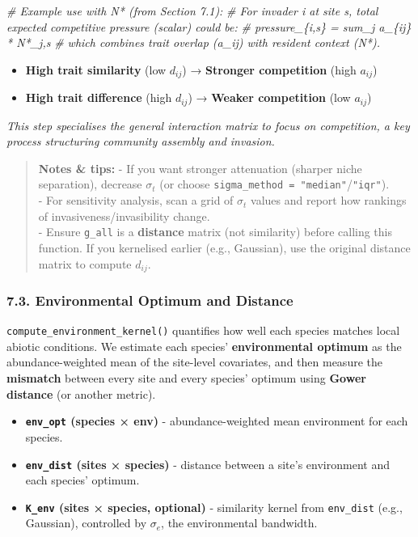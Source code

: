 \documentclass[
]{article}
\newenvironment{Shaded}{\begin{snugshade}}{\end{snugshade}}
\newcommand{\CommentTok}[1]{\textcolor[rgb]{0.56,0.35,0.01}{\textit{#1}}}
\providecommand{\tightlist}{%
  \setlength{\itemsep}{0pt}\setlength{\parskip}{0pt}}
\begin{document}
\begin{Shaded}
\begin{Highlighting}[]
\CommentTok{\# Example use with N* (from Section 7.1):}
\CommentTok{\# For invader i at site s, total expected competitive pressure (scalar) could be:}
\CommentTok{\#   pressure\_\{i,s\} = sum\_j a\_\{ij\} * N*\_j,s}
\CommentTok{\# which combines trait overlap (a\_ij) with resident context (N*).}
\end{Highlighting}
\end{Shaded}

\begin{itemize}
\tightlist
\item
  \textbf{High trait similarity} (low \(d_{ij}\)) → \textbf{Stronger
  competition} (high \(a_{ij}\))
\item
  \textbf{High trait difference} (high \(d_{ij}\)) → \textbf{Weaker
  competition} (low \(a_{ij}\))
\end{itemize}

\emph{This step specialises the general interaction matrix to focus on
competition, a key process structuring community assembly and invasion.}

\begin{quote}
\textbf{Notes \& tips:} - If you want stronger attenuation (sharper
niche separation), decrease \(\sigma_t\) (or choose
\texttt{sigma\_method\ =\ "median"}/\texttt{"iqr"}).\\
- For sensitivity analysis, scan a grid of \(\sigma_t\) values and
report how rankings of invasiveness/invasibility change.\\
- Ensure \texttt{g\_all} is a \textbf{distance} matrix (not similarity)
before calling this function. If you kernelised earlier (e.g.,
Gaussian), use the original distance matrix to compute \(d_{ij}\).
\end{quote}

\hypertarget{environmental-optimum-and-distance}{%
\subsubsection{7.3. Environmental Optimum and
Distance}\label{environmental-optimum-and-distance}}

\texttt{compute\_environment\_kernel()} quantifies how well each species
matches local abiotic conditions. We estimate each species'
\textbf{environmental optimum} as the abundance-weighted mean of the
site-level covariates, and then measure the \textbf{mismatch} between
every site and every species' optimum using \textbf{Gower distance} (or
another metric).

\begin{itemize}
\tightlist
\item
  \textbf{\texttt{env\_opt} (species × env)} - abundance-weighted mean
  environment for each species.
\item
  \textbf{\texttt{env\_dist} (sites × species)} - distance between a
  site's environment and each species' optimum.
\item
  \textbf{\texttt{K\_env} (sites × species, optional)} - similarity
  kernel from \texttt{env\_dist} (e.g., Gaussian), controlled by
  \textbf{\(\sigma_e\)}, the environmental bandwidth.
\end{itemize}
\end{document}
